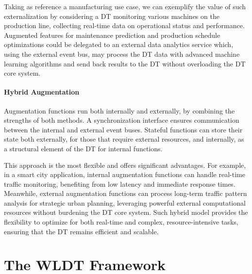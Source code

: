 Taking as reference a manufacturing use case, we can exemplify the value of such externalization by considering a \ac{DT} monitoring various machines on the production line, collecting real-time data on operational status and performance.
Augmented features for maintenance prediction and production schedule optimizations could be delegated to an external data analytics service which, using the external event bus, may process the \ac{DT} data with advanced machine learning algorithms and send back results to the \ac{DT} without overloading the \ac{DT} core system.

\paragraph{Hybrid Augmentation}
Augmentation functions run both internally and externally, by combining the strengths of both methods.
A synchronization interface ensures communication between the internal and external event buses.
%
Stateful functions can store their state both externally, for those that require external resources, and internally, as a structural element of the \ac{DT} for internal functions.

This approach is the most flexible and offers significant advantages.
For example, in a smart city application, internal augmentation functions can handle real-time traffic monitoring, benefiting from low latency and immediate response times.
Meanwhile, external augmentation functions can process long-term traffic pattern analysis for strategic urban planning, leveraging powerful external computational resources without burdening the \ac{DT} core system.
%
Such hybrid model provides the flexibility to optimize for both real-time and complex, resource-intensive tasks, ensuring that the \ac{DT} remains efficient and scalable.

\section{The \acl{WLDT} Framework}


